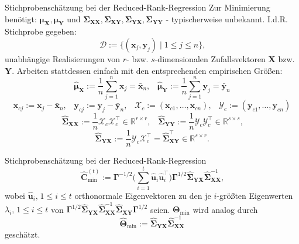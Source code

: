 \documentclass[12pt, aspectratio=169]{beamer}
\newcommand{\R}{\mathbb{R}}
\newcommand{\X}{\mathbf{X}}
\newcommand{\Y}{\mathbf{Y}}
\newcommand{\T}{\bm{\Theta}}
\newcommand{\muu}{\bm{\mu}}
\newcommand{\Ssigma}{\bm{\Sigma}}
\newcommand{\uu}{\mathbf{u}}
\newcommand{\C}{\mathbf{C}}
\newcommand{\Ggamma}{\bm{\Gamma}}
\newcommand{\xx}{\mathbf{x}}
\newcommand{\yy}{\mathbf{y}}
\newcommand{\XX}{\mathcal{X}}
\newcommand{\YY}{\mathcal{Y}}
\begin{document}
\begin{frame}{Stichprobenschätzung bei der Reduced-Rank-Regression}
	Zur Minimierung benötigt: $\muu_\X, \muu_\Y$ und $\Ssigma_{\X\X}, \Ssigma_{\X\Y}, \Ssigma_{\Y\X}, \Ssigma_{\Y\Y}$  - typischerweise unbekannt. 
	I.d.R. Stichprobe gegeben:
	\[\mathcal{D} := \{(\xx_j, \yy_j) \;|\; 1 \leq j \leq n\} \text{,}\]
	unabhängige Realisierungen von $r$- bzw. $s$-dimensionalen Zufallsvektoren $\X$ bzw. $\Y$.
	Arbeiten stattdessen einfach mit den entsprechenden empirischen Größen:
	\[\widehat{\muu}_{\X} := \frac{1}{n} \sum_{j=1}^{n} \mathbf{x}_j = \bar{\xx}_n \text{,} \quad \widehat{\muu}_{\Y} := \frac{1}{n} \sum_{j=1}^{n} \mathbf{y}_j = \bar{\yy}_n\]
	$$\xx_{cj} := \xx_j - \bar{\xx}_n \text{,} \quad \yy_{cj} := \yy_j - \bar{\yy}_n \text{,} \quad \XX_c := (\xx_{c1},\dots,\xx_{cn}) \text{,} \quad \YY_c := (\yy_{c1},\dots,\yy_{cn})$$
	$$ \widehat{\Ssigma}_{\X\X} := \frac{1}{n} \XX_c \XX_c^\top \in \R^{r \times r} \text{,} \quad \widehat{\Ssigma}_{\Y\Y} := \frac{1}{n} \YY_c \YY_c^\top \in \R^{s \times s} \text{,}$$
	\[\widehat{\Ssigma}_{\Y\X} := \frac{1}{n} \YY_c \XX_c^\top = \widehat{\Ssigma}_{\X\Y}^\top \in \R^{s \times r} \text{.}\]
\end{frame}

\begin{frame}{Stichprobenschätzung bei der Reduced-Rank-Regression}
	$$\widehat{\C}^{(t)}_{\min} := \Ggamma^{-1/2} \biggl( \sum_{i=1}^{t} \widehat{\uu}_i \widehat{\uu}_i^\top \biggr) \Ggamma^{1/2} \widehat{\Ssigma}_{\Y\X} \widehat{\Ssigma}_{\X\X}^{-1} \text{,}$$
	wobei $\widehat{\uu}_i\text{,} \; 1 \leq i \leq t$ orthonormale Eigenvektoren zu den je $i$-größten Eigenwerten $\lambda_i \text{,} \; 1 \leq i \leq t$ von
	$\Ggamma^{1/2} \widehat{\Ssigma}_{\Y\X} \widehat{\Ssigma}_{\X\X}^{-1} \widehat{\Ssigma}_{\X\Y} \Ggamma^{1/2}$ seien. $\T_{\min}$ wird analog durch
	$$\widehat{\T}_{\min} := \widehat{\Ssigma}_{\Y\X} \widehat{\Ssigma}_{\X\X}^{-1}$$
	geschätzt.
\end{frame}
\end{document}
